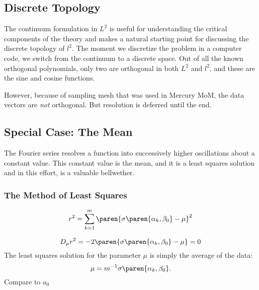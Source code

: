 \subsection{Discrete Topology}
The continuum formulation in $L^{2}$ is useful for understanding the critical components of the theory and makes a natural starting point for discussing the discrete topology of $l^{2}$. The moment we discretize the problem in a computer code, we switch from the continuum to a discrete space. Out of all the known orthogonal polynomials, only two are orthogonal in both $L^{2}$ and $l^{2}$, and these are the sine and cosine functions. 

However, because of sampling mesh that was used in Mercury MoM, the data vectors are {\it{not}} orthogonal. But resolution is deferred until the end.



\subsection{\label{sec:special-case}Special Case: The Mean}
The Fourier series resolves a function into successively higher oscillations about a constant value. This constant value is the mean, and it is a least squares solution and in this effort, is a valuable bellwether.

\subsubsection{The Method of Least Squares}
\begin{equation}
	r^{2} = \sum_{k=1}^{m} \paren{ \sigma\paren{\alpha_{k},\beta_{0}} - \mu }^{2}
\end{equation}

\begin{equation}
	D_{\mu} r^{2} = -2 \paren{ \sigma\paren{\alpha_{k},\beta_{0}} - \mu } = 0
\end{equation}
The least squares solution for the parameter $\mu$ is simply the average of the data:
\begin{equation}
	\mu = m^{-1}\sigma\paren{\alpha_{k},\beta_{0}}.
\end{equation}
Compare to $a_{0}$

